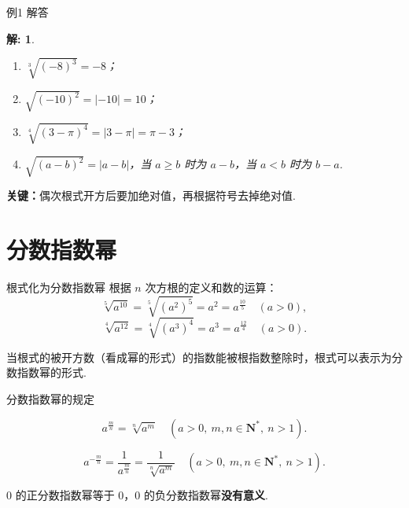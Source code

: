 \documentclass[aspectratio=169,13pt,t,fleqn] {beamer}
\newtheorem*{solve}{解:}
\theoremstyle{definition}
\begin{document}
\begin{frame}{例1 解答}
	\begin{solve}
		\begin{enumerate}[(1)]
			\item \(\sqrt[3]{(-8)^3}=-8\)；
			\item \(\sqrt{(-10)^2}=|-10|=10\)；
			\item \(\sqrt[4]{(3-\pi)^4}=|3-\pi|=\pi-3\)；
			\item \(\sqrt{(a-b)^2}=|a-b|\)，当 \(a\geqslant b\) 时为 \(a-b\)，当 \(a<b\) 时为 \(b-a\).
		\end{enumerate}
	\end{solve}
	\vspace{1em}
	\begin{summarybox-answer}
		\textbf{关键：}偶次根式开方后要加绝对值，再根据符号去掉绝对值.
	\end{summarybox-answer}
\end{frame}

\section{分数指数幂}

\begin{frame}{根式化为分数指数幂}
	根据 \(n\) 次方根的定义和数的运算：
	\[
		\sqrt[5]{a^{10}}=\sqrt[5]{(a^2)^5}=a^2=a^{\frac{10}{5}}\quad (a>0),
	\]
	\[
		\sqrt[4]{a^{12}}=\sqrt[4]{(a^3)^4}=a^3=a^{\frac{12}{4}}\quad (a>0).
	\]
	\vspace{0em}
	\pause
	\begin{summarybox-answer}
		当根式的被开方数（看成幂的形式）的指数能被根指数整除时，根式可以表示为分数指数幂的形式.
	\end{summarybox-answer}
\end{frame}

\begin{frame}{分数指数幂的规定}
	\begin{summarybox}[正数的正分数指数幂]
		\[
			a^{\frac{m}{n}}=\sqrt[n]{a^m}\quad (a>0,\ m,n\in \mathbf{N}^{*},\ n>1).
		\]
	\end{summarybox}
	
	\begin{summarybox}[正数的负分数指数幂]
		\[
			a^{-\frac{m}{n}}=\frac{1}{a^{\frac{m}{n}}}=\frac{1}{\sqrt[n]{a^m}}\quad (a>0,\ m,n\in \mathbf{N}^{*},\ n>1).
		\]
	\end{summarybox}
	

	\begin{summarybox}[0的分数指数幂]
		\(0\) 的正分数指数幂等于 \(0\)，\(0\) 的负分数指数幂\textbf{没有意义}.
	\end{summarybox}
\end{frame}
\end{document}
